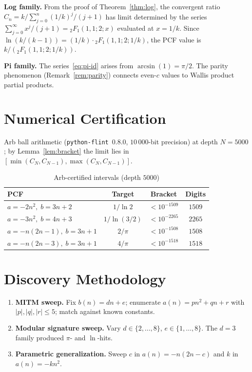 \documentclass[11pt,a4paper]{article}
\theoremstyle{plain}
\theoremstyle{remark}
\begin{document}
\textbf{Log family.}
From the proof of Theorem~\ref{thm:log}, the convergent ratio
$C_n = k/\sum_{j=0}^n (1/k)^j/(j{+}1)$ has limit determined by
the series $\sum_{j=0}^\infty x^j/(j{+}1) = {}_2F_1(1,1;2;x)$
evaluated at $x = 1/k$.  Since
$\ln(k/(k{-}1)) = (1/k)\cdot{}_2F_1(1,1;2;1/k)$, the PCF value
is $k/({}_2F_1(1,1;2;1/k))$.

\textbf{Pi family.}
The series~\eqref{eq:pi-id} arises from $\arcsin(1)=\pi/2$.
The parity phenomenon (Remark~\ref{rem:parity}) connects even-$c$
values to Wallis product partial products.

\section{Numerical Certification}\label{sec:cert}

Arb ball arithmetic (\texttt{python-flint}~0.8.0, $10\,000$-bit precision)
at depth $N{=}5000$; by Lemma~\ref{lem:bracket}
the limit lies in $[\min(C_N,C_{N-1}),\max(C_N,C_{N-1})]$.

\begin{table}[h]
\centering
\caption{Arb-certified intervals (depth $5000$)}\label{tab:cert}
\begin{tabular}{@{}lccc@{}}
\toprule
PCF & Target & Bracket & Digits \\
\midrule
$a=-2n^2,\;b=3n{+}2$      & $1/\ln 2$    & $<10^{-1509}$ & $1509$ \\
$a=-3n^2,\;b=4n{+}3$      & $1/\ln(3/2)$ & $<10^{-2265}$ & $2265$ \\
$a=-n(2n{-}1),\;b=3n{+}1$ & $2/\pi$      & $<10^{-1508}$ & $1508$ \\
$a=-n(2n{-}3),\;b=3n{+}1$ & $4/\pi$      & $<10^{-1518}$ & $1518$ \\
\bottomrule
\end{tabular}
\end{table}

\section{Discovery Methodology}

\begin{enumerate}
\item \textbf{MITM sweep.}
  Fix $b(n)=dn{+}e$; enumerate $a(n)=pn^2{+}qn{+}r$
  with $|p|,|q|,|r|\le 5$; match against known constants.
\item \textbf{Modular signature sweep.}
  Vary $d\in\{2,\ldots,8\}$, $e\in\{1,\ldots,8\}$.
  The $d{=}3$ family produced $\pi$- and $\ln$-hits.
\item \textbf{Parametric generalization.}
  Sweep $c$ in $a(n)=-n(2n{-}c)$ and $k$ in $a(n)=-kn^2$.
\end{enumerate}
\end{document}
